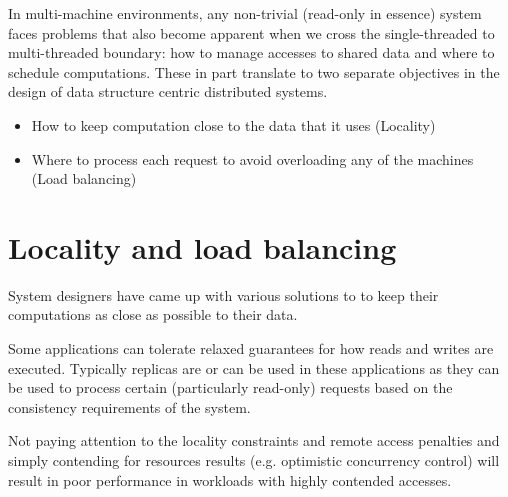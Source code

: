 In multi-machine environments, any non-trivial (read-only in essence) system
faces problems that also become apparent when we cross the single-threaded
to multi-threaded boundary: how to manage accesses to shared data and where to
schedule computations. These in part translate to two separate objectives in
the design of data structure centric distributed systems.  
\begin{itemize}
    \item How to keep computation close to the data that it uses (Locality)
    \item Where to process each request to avoid overloading any of the machines (Load balancing)
\end{itemize}





\section{Locality and load balancing}
System designers have came up with various solutions to to keep their
computations as close as possible to their data.

Some applications can tolerate relaxed guarantees for how reads and writes are
executed. 
Typically replicas are or can be used in these applications as they can be
used to process certain (particularly read-only) requests based on the
consistency requirements of the system.

Not paying attention to the locality constraints and remote access penalties
and simply contending for resources results (e.g. optimistic concurrency
control) will result in poor performance in workloads with highly contended
accesses.

